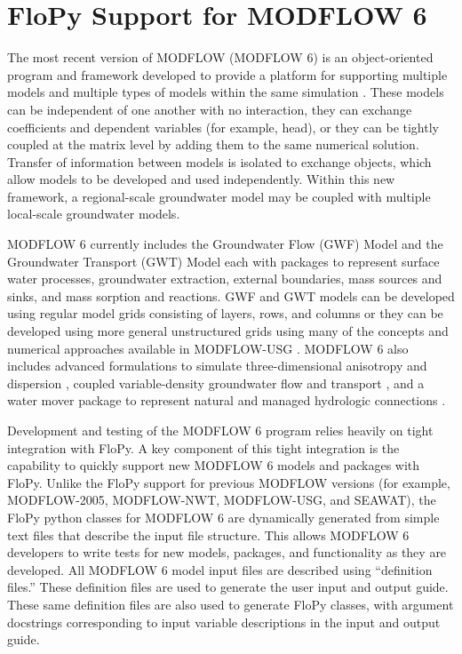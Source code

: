 \documentclass[11pt, oneside]{article}   	%
\begin{document}
\section{FloPy Support for MODFLOW 6}

The most recent version of MODFLOW (MODFLOW 6) is an object-oriented program and framework developed to provide a platform for supporting multiple models and multiple types of models within the same simulation \citep{modflow6gwf, modflow6framework, morway2021use}. These models can be independent of one another with no interaction, they can exchange coefficients and dependent variables (for example, head), or they can be tightly coupled at the matrix level by adding them to the same numerical solution. Transfer of information between models is isolated to exchange objects, which allow models to be developed and used independently. Within this new framework, a regional-scale groundwater model may be coupled with multiple local-scale groundwater models. 

MODFLOW 6 currently includes the Groundwater Flow (GWF) Model and the Groundwater Transport (GWT) Model each with packages to represent surface water processes,  groundwater extraction, external boundaries, mass sources and sinks, and mass sorption and reactions.  GWF and GWT models can be developed using regular model grids consisting of layers, rows, and columns or they can be developed using more general unstructured grids using many of the concepts and numerical approaches available in MODFLOW-USG  \citep{modflowusg}.  MODFLOW 6 also includes advanced formulations to simulate three-dimensional anisotropy and dispersion \citep{modflow6xt3d}, coupled variable-density groundwater flow and transport \citep{langevin2020hydraulic}, and a water mover package to represent natural and managed hydrologic connections \citep{morway2021use}.

Development and testing of the MODFLOW 6 program relies heavily on tight integration with FloPy.  A key component of this tight integration is the capability to quickly support new MODFLOW 6 models and packages with FloPy.  Unlike the FloPy support for previous MODFLOW versions (for example, MODFLOW-2005, MODFLOW-NWT, MODFLOW-USG, and SEAWAT), the FloPy python classes for MODFLOW 6 are dynamically generated from simple text files that describe the input file structure.  This allows MODFLOW 6 developers to write tests for new models, packages, and functionality as they are developed.  All MODFLOW 6 model input files are described using ``definition files.''  These definition files are used to generate the user input and output guide.  These same definition files are also used to generate FloPy classes, with argument docstrings corresponding to input variable descriptions in the input and output guide.
\end{document}
